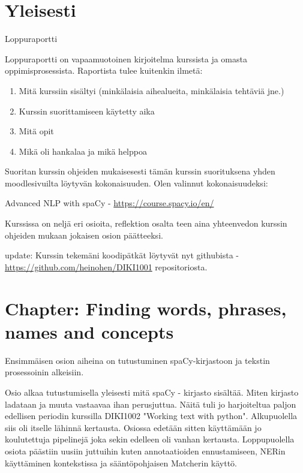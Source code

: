 \documentclass{article}
\begin{document}
\pagestyle{fancy}
\fancyhead{} %



 \section*{Yleisesti}

 Loppuraportti

Loppuraportti on vapaamuotoinen kirjoitelma kurssista ja omasta oppimisprosessista. Raportista tulee kuitenkin ilmetä:
\begin{enumerate}
    \item     Mitä kurssiin sisältyi (minkälaisia aihealueita, minkälaisia tehtäviä jne.)
    \item     Kurssin suorittamiseen käytetty aika 
    \item       Mitä opit
    \item     Mikä oli hankalaa ja mikä helppoa
\end{enumerate}

    Suoritan kurssin ohjeiden mukaisesesti tämän kurssin suorituksena yhden moodlesivuilta löytyvän kokonaisuuden. Olen valinnut kokonaisuudeksi: 

    Advanced NLP with spaCy - \url{https://course.spacy.io/en/}

    Kurssissa on neljä eri osioita, reflektion osalta teen aina yhteenvedon kurssin ohjeiden mukaan jokaisen osion päätteeksi.

    update: Kurssin tekemäni koodipätkät löytyvät nyt githubista - \url{https://github.com/heinohen/DIKI1001} repositoriosta.
\section{Chapter: Finding words, phrases, names and concepts}

Ensimmäisen osion aiheina on tutustuminen spaCy-kirjastoon ja tekstin prosessoinin alkeisiin.

Osio alkaa tutustumisella yleisesti mitä spaCy - kirjasto sisältää. Miten kirjasto ladataan ja muuta vastaavaa ihan perusjuttua. Näitä tuli jo harjoiteltua paljon edellisen periodin kurssilla 
DIKI1002 "Working text with python". Alkupuolella siis oli itselle lähinnä kertausta. Osiossa edetään sitten käyttämään jo koulutettuja pipelinejä joka sekin edelleen oli vanhan kertausta. Loppupuolella osiota päästiin uusiin juttuihin kuten annotaatioiden ennustamiseen, NERin käyttäminen kontekstissa ja sääntöpohjaisen Matcherin käyttö.
\end{document}
